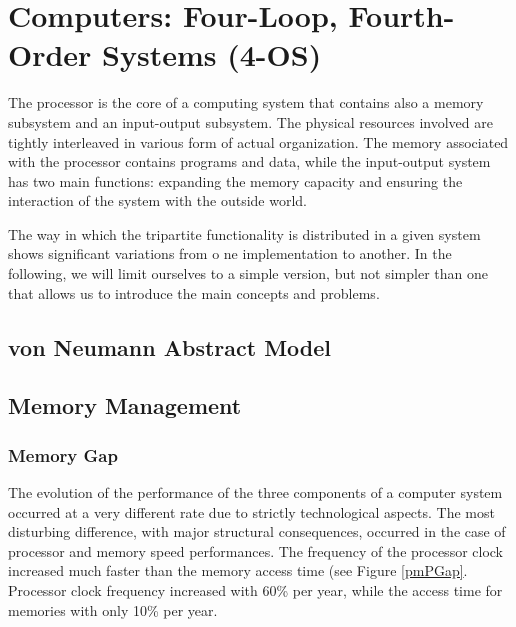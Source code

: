 \chapter{Computers: Four-Loop, Fourth-Order Systems (4-OS)}\label{lect6}


The processor is the core of a computing system that contains also a memory subsystem and an input-output subsystem. The physical resources involved are tightly interleaved in various form of actual organization. The memory associated with the processor contains programs and data, while the input-output system has two main functions: expanding the memory capacity and ensuring the interaction of the system with the outside world.


The way in which the tripartite functionality is distributed in a given system shows significant variations from o  ne implementation to another. In the following, we will limit ourselves to a simple version, but not simpler than one that allows us to introduce the main concepts and problems.

\section{von Neumann Abstract Model}

\section{Memory Management}

\subsection{Memory Gap}\label{memGap}

The evolution of the performance of the three components of a computer system occurred at a very different rate due to strictly technological aspects. The most disturbing difference, with major structural consequences, occurred in the case of processor and memory speed performances. The frequency of the processor clock increased  much faster than the memory access time (see Figure \ref{pmPGap}. Processor clock frequency increased with 60\% per year, while the access time for memories with only 10\% per year.

